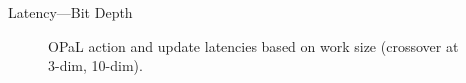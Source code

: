 \documentclass[aspectratio=169,xcolor={dvipsnames}
]{beamer}
\newcommand{\approachshort}{OPaL}
\begin{document}
\begin{frame}{Latency---Bit Depth}
	\begin{figure}
		\centering
		\begin{subfigure}{0.49\linewidth}
		\end{subfigure}
		\begin{subfigure}{0.49\linewidth}
		\end{subfigure}
	\caption{\approachshort{} action and update latencies based on work size (crossover at 3-dim, 10-dim).}
	\end{figure}
\end{frame}
\end{document}
